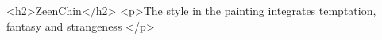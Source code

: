 <h2>ZeenChin</h2>
                <p>The style in the painting integrates temptation, fantasy and strangeness
                </p>